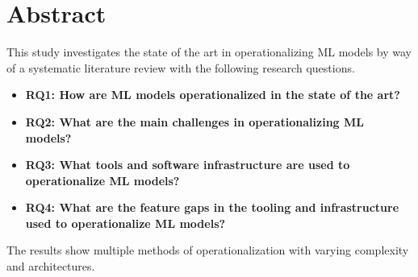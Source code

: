 \chapter*{Abstract}

This study investigates the state of the art in operationalizing ML models by way of a systematic literature review with the following research questions.
\begin{itemize}
    \item \textbf{RQ1: How are ML models operationalized in the state of the art?}
    \item \textbf{RQ2: What are the main challenges in operationalizing ML models?}
    \item \textbf{RQ3: What tools and software infrastructure are used to operationalize ML models?}
    \item \textbf{RQ4: What are the feature gaps in the tooling and infrastructure used to operationalize ML models?}
\end{itemize}
The results show multiple methods of operationalization with varying complexity and architectures.